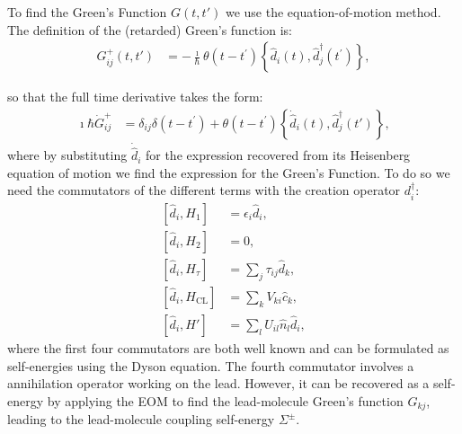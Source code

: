 \documentclass{article}
\begin{document}
\begin{multicols}{2}
        To find the Green's Function $G(t,t')$ we use the equation-of-motion method. The definition of the (retarded) Green's function is:
       \begin{align*}
        G_{ij}^+(t,t') &= - \frac{\imath}{\hbar} \theta(t-t^\prime) \left\{ \hat{d}_i(t), \hat{d}_j^\dagger(t^\prime) \right\},
        \end{align*} 
        
        so that the full time derivative takes the form:
        \begin{align}
        \imath\hbar \dot{G}_{ij}^+ &= \delta_{ij} \delta(t - t^\prime) + \theta(t-t^\prime) \left\{ \dot{\hat{d}}_i (t), \hat{d}_j^\dagger (t')\right\},
        \label{eq:eomgf} 
        \end{align} where by substituting $\dot{\hat{d}}_i$ for the expression recovered from its Heisenberg equation of motion we find the expression for the Green's Function. To do so we need the commutators of the different terms with the creation operator $d^\dagger_i$:
        \begin{align*}
            \left[ \hat{d}_i, H_1 \right] &= \epsilon_i \hat{d}_i, \\
            \left[ \hat{d}_i, H_2 \right] &= 0, \\
            \left[ \hat{d}_i, H_\tau \right] &= \sum_j \tau_{ij} \hat{d}_k, \\
            \left[ \hat{d}_i, H_\text{CL} \right] &= \sum_k V_{ki} \hat{c}_k,\\
            \left[ \hat{d}_i, H' \right] &= \sum_l U_{il} \hat{n}_l \hat{d}_i,
        \end{align*}
        where the first four commutators are both well known and can be formulated as self-energies using the Dyson equation. The fourth commutator involves a annihilation operator working on the lead. However, it can be recovered as a self-energy by applying the EOM to find the lead-molecule Green's function $G_{kj}$, leading to the lead-molecule coupling self-energy $\Sigma^\pm$.        
        

\end{multicols}
\end{document}

